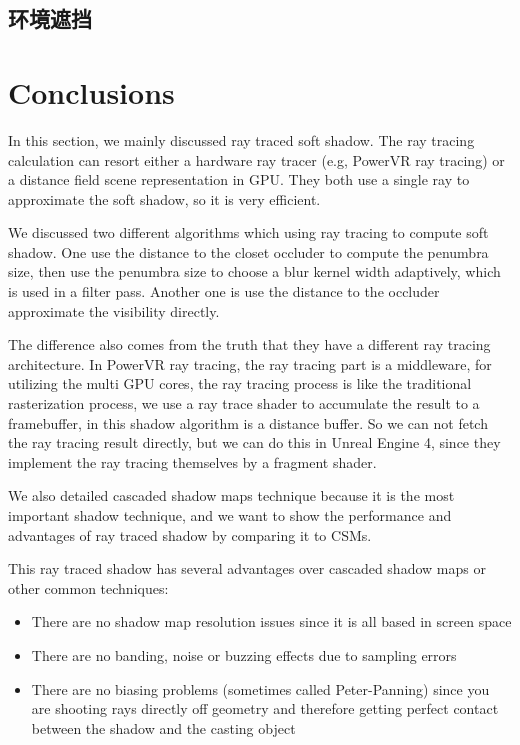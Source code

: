 \subsection{环境遮挡}

\section{Conclusions}
In this section, we mainly discussed ray traced soft shadow. The ray tracing calculation can resort either a hardware ray tracer (e.g, PowerVR ray tracing) or a distance field scene representation in GPU. They both use a single ray to approximate the soft shadow, so it is very efficient. 

We discussed two different algorithms which using ray tracing to compute soft shadow. One use the distance to the closet occluder to compute the penumbra size, then use the penumbra size to choose a blur kernel width adaptively, which is used in a filter pass. Another one is use the distance to the occluder approximate the visibility directly.

The difference also comes from the truth that they have a different ray tracing architecture. In PowerVR ray tracing, the ray tracing part is a middleware, for utilizing the multi GPU cores, the ray tracing process is like the traditional rasterization process, we use a ray trace shader to accumulate the result to a framebuffer, in this shadow algorithm is a distance buffer. So we can not fetch the ray tracing result directly, but we can do this in Unreal Engine 4, since they implement the ray tracing themselves by a fragment shader.

We also detailed cascaded shadow maps technique because it is the most important shadow technique, and we want to show the performance and advantages of ray traced shadow by comparing it to CSMs.

This ray traced shadow has several advantages over cascaded shadow maps or other common techniques:

\begin{itemize}
	\item There are no shadow map resolution issues since it is all based in screen space
	\item There are no banding, noise or buzzing effects due to sampling errors
	\item There are no biasing problems (sometimes called Peter-Panning) since you are shooting rays directly off geometry and therefore getting perfect contact between the shadow and the casting object
\end{itemize}


